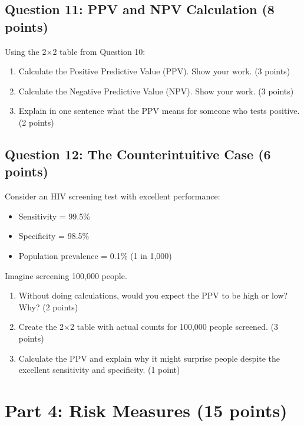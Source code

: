 \documentclass[11pt]{article}
\begin{document}
\vspace{3cm}

\subsection*{Question 11: PPV and NPV Calculation (8 points)}

Using the 2$\times$2 table from Question 10:

\begin{enumerate}[label=\alph*)]
\item Calculate the Positive Predictive Value (PPV). Show your work. (3 points)
\item Calculate the Negative Predictive Value (NPV). Show your work. (3 points)
\item Explain in one sentence what the PPV means for someone who tests positive. (2 points)
\end{enumerate}

\vspace{1.5cm}

\subsection*{Question 12: The Counterintuitive Case (6 points)}

Consider an HIV screening test with excellent performance:
\begin{itemize}
\item Sensitivity = 99.5\%
\item Specificity = 98.5\%
\item Population prevalence = 0.1\% (1 in 1,000)
\end{itemize}

Imagine screening 100,000 people.

\begin{enumerate}[label=\alph*)]
\item Without doing calculations, would you expect the PPV to be high or low? Why? (2 points)
\item Create the 2$\times$2 table with actual counts for 100,000 people screened. (3 points)
\item Calculate the PPV and explain why it might surprise people despite the excellent sensitivity and specificity. (1 point)
\end{enumerate}

\vspace{3cm}

\section{Part 4: Risk Measures (15 points)}
\end{document}
